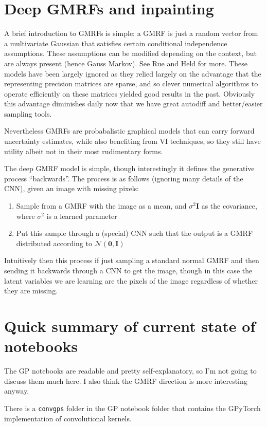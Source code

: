 \documentclass{article}
\begin{document}
\section{Deep GMRFs and inpainting}
A brief introduction to GMRFs is simple: a GMRF is just a random vector from
a multivariate Gaussian that satisfies certain conditional independence assumptions.
These assumptions can be modified depending on the context, but are always present
(hence Gauss Markov). See Rue and Held for more\cite{gmrf}. These models have been largely ignored as they relied largely
on the advantage that the representing precision matrices are sparse, and so
clever numerical algorithms to operate efficiently on these matrices yielded
good results in the past. Obviously this advantage diminishes daily now that
we have great autodiff and better/easier sampling tools.

Nevertheless GMRFs are probabalistic graphical models that can carry forward
uncertainty estimates, while also benefiting from VI techniques, so they still
have utility albeit not in their most rudimentary forms.

The deep GMRF model is simple, though interestingly it defines the generative
process ``backwards''. The process is as follows (ignoring
many details of the CNN), given
an image with missing pixels:
\begin{enumerate}
	\item Sample from a GMRF with the image as a mean, and $\sigma^2 \bm{I}$
	as the covariance, where $\sigma^2$ is a learned parameter
	\item Put this sample through a (special) CNN such that the output is
	a GMRF distributed according to $\mathcal{N}(\bm{0},\bm{I})$
\end{enumerate}
Intuitively then this process if just sampling a standard normal GMRF and then
sending it backwards through a CNN to get the image, though in this case the latent
variables we are learning are the pixels of the image regardless of whether they
are missing.

\section{Quick summary of current state of notebooks}
The GP notebooks are readable and pretty self-explanatory, so I'm not going to
discuss them much here. I also think the GMRF direction is more interesting
anyway.

There is a \lstinline{convgps} folder in the GP notebook
folder that contains the GPyTorch implementation of convolutional kernels.
\end{document}

